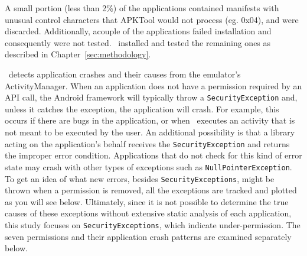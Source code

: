 A small portion (less than 2\%) of the applications contained manifests with unusual control characters that APKTool would not process (eg. 0x04), and were discarded.  Additionally, acouple of the applications failed installation and consequently were not tested. \toolname\ installed and tested the remaining ones as described in Chapter~\ref{sec:methodology}. 

\toolname\ detects application crashes and their causes from the emulator's ActivityManager.  When an application does not have a permission required by an API call, the Android framework will typically throw a \texttt{SecurityException} and, unless it catches the exception, the application will crash.   For example, this occurs if there are bugs in the application, or when \toolname\ executes an activity that is not meant to be executed by the user.  An additional possibility is that a library acting on the application's behalf receives the \texttt{SecurityException} and returns the improper error condition.  Applications that do not check for this kind of error state may crash with other types of exceptions such as \texttt{NullPointerException}.  To get an idea of what new errors, besides \texttt{SecurityExceptions}, might be thrown when a permission is removed, all the exceptions are tracked and plotted as you will see below.  Ultimately, since it is not possible to determine the true causes of these exceptions without extensive static analysis of each application, this study focuses on \texttt{SecurityExceptions}, which indicate under-permission.  The seven permissions and their application crash patterns are examined separately below.


